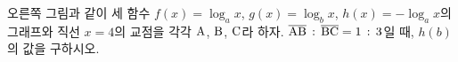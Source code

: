 \noindent\begin{minipage}[t]{0.58\linewidth}\vspace{0pt}\raggedright 오른쪽 그림과 같이 세 함수 $f(x)=\log_a x$, $g(x)=\log_b x$, $h(x)=-\log_a x$의 그래프와 직선 $x=4$의 교점을 각각 $\mathrm{A}$, $\mathrm{B}$, $\mathrm{C}$라 하자. $\overline{\mathrm{AB}}\mkern3mu :\mkern3mu \overline{\mathrm{BC}}=1\mkern3mu :\mkern3mu 3$일 때, $h(b)$의 값을 구하시오. \end{minipage}\hfill\begin{minipage}[t]{0.4\linewidth}\vspace{0pt}\centering \resizebox{\ifdim\width>\linewidth\linewidth\else\width\fi}{!}{}\end{minipage}\par
